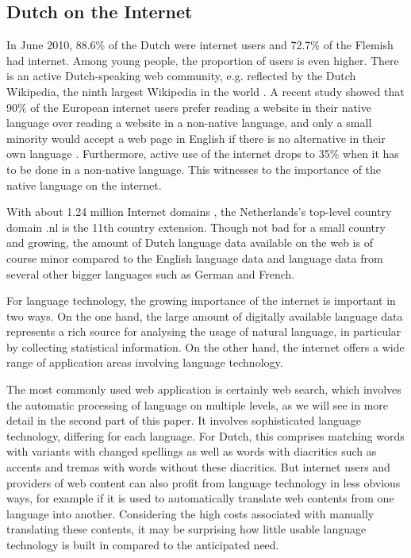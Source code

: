 \begin{multicols}{2}
\subsection{Dutch on the Internet}

  In June 2010, 88.6\% of the Dutch \cite{Internetworldstats} were internet users and 72.7\% of the Flemish  \cite{VRIND} had internet. Among young people, the proportion of users is even higher. There is an active Dutch-speaking web community, e.g. reflected by the Dutch Wikipedia, the ninth largest Wikipedia in the world \cite{Wikipedia}.  A recent study showed that 90\% of the European internet users prefer reading a website in their native language over reading a website in a non-native language, and only a small minority would accept a web page in English if there is no alternative in their own language \cite{EC1}. Furthermore, active use of the internet drops to 35\% when it has to be done in a non-native language. This witnesses to the importance of the native language on the internet.


    With about 1.24 million Internet domains \cite{Webstats}, the Netherlands's top-level country domain .nl is the 11th country extension. Though not bad for a small country and growing, the amount of Dutch language data available on the web is of course minor compared to the English language data and language data from several other bigger languages such as German and French.

    For language technology, the growing importance of the internet is important in two ways. On the one hand, the large amount of digitally available language data represents a rich source for analysing the usage of natural language, in particular by collecting statistical information. On the other hand, the internet offers a wide range of application areas involving language technology.


    The most commonly used web application is certainly web search, which involves the automatic processing of language on multiple levels, as we will see in more detail in the second part of this paper. It involves sophisticated language technology, differing for each language. For Dutch, this comprises matching words with variants with changed spellings as well as words with diacritics such as accents and tremas with words without these diacritics. But internet users and providers of web content can also profit from language technology in less obvious ways, for example if it is used to automatically translate web contents from one language into another. Considering the high costs associated with manually translating these contents, it may be surprising how little usable language technology is built in compared to the anticipated need.


\end{multicols}
